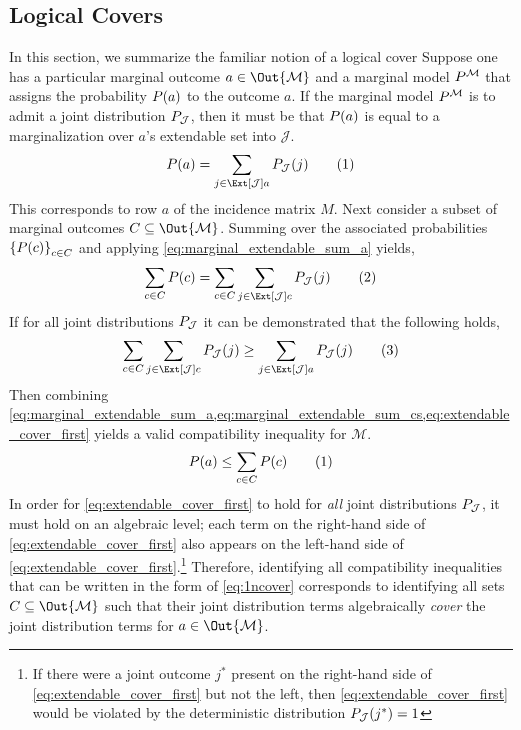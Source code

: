 \documentclass[aps, 10pt, english, twoside, pra, nofootinbib, longbibliography]{revtex4-1}
\theoremstyle{plain}
\newtheorem{lemma}[theorem]{Lemma}
\theoremstyle{definition}
\theoremstyle{remark}
\newcommand{\mscenario}{\mathcal{M}}
\newcommand{\jointvar}{\mathcal{J}}
\begin{document}
    \subsection{Logical Covers}
    In this section, we summarize the familiar notion of a logical cover
    Suppose one has a particular marginal outcome $a \in \Out{\mscenario}$ and a marginal model $\prob^{\mscenario}$ that assigns the probability $\prob[][a]$ to the outcome $a$. If the marginal model $\prob^{\mscenario}$ is to admit a joint distribution $\prob[\jointvar]$, then it must be that $\prob[][a]$ is equal to a marginalization over $a$'s extendable set into $\jointvar$.
    \[ \prob[][a] = \sum_{j \in \Ext[\jointvar]{a}}\prob[\jointvar][j] \eq \label{eq:marginal_extendable_sum_a}\]
    This corresponds to row $a$ of the incidence matrix $M$. Next consider a subset of marginal outcomes $C \subseteq \Out{\mscenario}$. Summing over the associated probabilities $\bc{\prob[][c]}_{c \in C}$ and applying \cref{eq:marginal_extendable_sum_a} yields,
    \[ \sum_{c \in C}\prob[][c] = \sum_{c \in C}\sum_{j \in \Ext[\jointvar]{c}}\prob[\jointvar][j] \eq \label{eq:marginal_extendable_sum_cs} \]
    If for all joint distributions $\prob[\jointvar]$ it can be demonstrated that the following holds,
    \[ \sum_{c \in C}\sum_{j \in \Ext[\jointvar]{c}}\prob[\jointvar][j] \geq \sum_{j \in \Ext[\jointvar]{a}}\prob[\jointvar][j] \eq \label{eq:extendable_cover_first} \]
    Then combining \cref{eq:marginal_extendable_sum_a,eq:marginal_extendable_sum_cs,eq:extendable_cover_first} yields a valid compatibility inequality for $\mscenario$.
    \[ \prob[][a] \leq \sum_{c \in C}\prob[][c] \eq \label{eq:1ncover} \]
    In order for \cref{eq:extendable_cover_first} to hold for \textit{all} joint distributions $\prob[\jointvar]$, it must hold on an algebraic level; each term on the right-hand side of \cref{eq:extendable_cover_first} also appears on the left-hand side of \cref{eq:extendable_cover_first}.\footnote{If there were a joint outcome $j^*$ present on the right-hand side of \cref{eq:extendable_cover_first} but not the left, then \cref{eq:extendable_cover_first} would be violated by the deterministic distribution $\prob[\jointvar][j^*] = 1$} Therefore, identifying all compatibility inequalities that can be written in the form of \cref{eq:1ncover} corresponds to identifying all sets $C \subseteq \Out{\mscenario}$ such that their joint distribution terms algebraically \textit{cover} the joint distribution terms for $a \in \Out{\mscenario}$.
\end{document}
